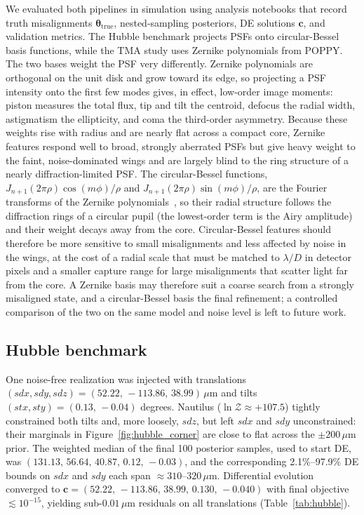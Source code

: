 \documentclass[fleqn,usenatbib]{rasti}
\begin{document}
We evaluated both pipelines in simulation using analysis notebooks that record truth misalignments $\boldsymbol{\theta}_{\mathrm{true}}$, nested-sampling posteriors, DE solutions $\mathbf{c}$, and validation metrics. The Hubble benchmark projects PSFs onto circular-Bessel basis functions, while the TMA study uses Zernike polynomials from POPPY. The two bases weight the PSF very differently. Zernike polynomials are orthogonal on the unit disk and grow toward its edge, so projecting a PSF intensity onto the first few modes gives, in effect, low-order image moments: piston measures the total flux, tip and tilt the centroid, defocus the radial width, astigmatism the ellipticity, and coma the third-order asymmetry. Because these weights rise with radius and are nearly flat across a compact core, Zernike features respond well to broad, strongly aberrated PSFs but give heavy weight to the faint, noise-dominated wings and are largely blind to the ring structure of a nearly diffraction-limited PSF. The circular-Bessel functions, $J_{n+1}(2\pi\rho)\cos(m\phi)/\rho$ and $J_{n+1}(2\pi\rho)\sin(m\phi)/\rho$, are the Fourier transforms of the Zernike polynomials~\citep{Noll1976}, so their radial structure follows the diffraction rings of a circular pupil (the lowest-order term is the Airy amplitude) and their weight decays away from the core. Circular-Bessel features should therefore be more sensitive to small misalignments and less affected by noise in the wings, at the cost of a radial scale that must be matched to $\lambda/D$ in detector pixels and a smaller capture range for large misalignments that scatter light far from the core. A Zernike basis may therefore suit a coarse search from a strongly misaligned state, and a circular-Bessel basis the final refinement; a controlled comparison of the two on the same model and noise level is left to future work.

\subsection{Hubble benchmark}\label{sec:hubble_results}

One noise-free realization was injected with translations $(sdx,sdy,sdz)=(52.22,\,-113.86,\,38.99)\,\mu\mathrm{m}$ and tilts $(stx,sty)=(0.13,\,-0.04)$ degrees. Nautilus ($\ln\mathcal{Z}\approx +107.5$) tightly constrained both tilts and, more loosely, $sdz$, but left $sdx$ and $sdy$ unconstrained: their marginals in Figure~\ref{fig:hubble_corner} are close to flat across the $\pm200\,\mu\mathrm{m}$ prior. The weighted median of the final 100 posterior samples, used to start DE, was $(131.13,\,56.64,\,40.87,\,0.12,\,-0.03)$, and the corresponding 2.1\%--97.9\% DE bounds on $sdx$ and $sdy$ each span $\approx 310$--$320\,\mu\mathrm{m}$. Differential evolution converged to $\mathbf{c}=(52.22,\,-113.86,\,38.99,\,0.130,\,-0.040)$ with final objective $\lesssim 10^{-15}$, yielding sub-$0.01\,\mu\mathrm{m}$ residuals on all translations (Table~\ref{tab:hubble}).
\end{document}
